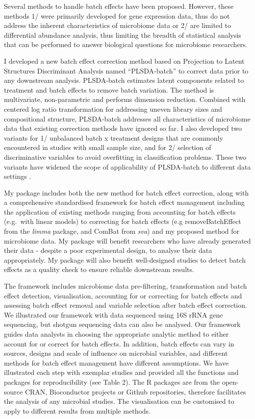 \documentclass[
]{book}
\begin{document}
Several methods to handle batch effects have been proposed. However, these methods 1/ were primarily developed for gene expression data, thus do not address the inherent characteristics of microbiome data or 2/ are limited to differential abundance analysis, thus limiting the breadth of statistical analysis that can be performed to answer biological questions for microbiome researchers.

I developed a new batch effect correction method based on Projection to Latent Structures Discriminant Analysis named ``PLSDA-batch'' to correct data prior to any downstream analysis. PLSDA-batch estimates latent components related to treatment and batch effects to remove batch variation. The method is multivariate, non-parametric and performs dimension reduction. Combined with centered log ratio transformation for addressing uneven library sizes and compositional structure, PLSDA-batch addresses all characteristics of microbiome data that existing correction methods have ignored so far. I also developed two variants for 1/ unbalanced batch x treatment designs that are commonly encountered in studies with small sample size, and for 2/ selection of discriminative variables to avoid overfitting in classification problems. These two variants have widened the scope of applicability of PLSDA-batch to different data settings \citep{wang2020multivariate}.

My package includes both the new method for batch effect correction, along with a comprehensive standardised framework for batch effect management including the application of existing methods ranging from accounting for batch effects (e.g.~with linear models) to correcting for batch effects (e.g removeBatchEffect from the \emph{limma} package, and ComBat from \emph{sva}) and my proposed method for microbiome data. My package will benefit researchers who have already generated their data - despite a poor experimental design, to analyse their data appropriately. My package will also benefit well-designed studies to detect batch effects as a quality check to ensure reliable downstream results.

The framework includes microbiome data pre-filtering, transformation and batch effect detection, visualisation, accounting for or correcting for batch effects and assessing batch effect removal and variable selection after batch effect correction. We illustrated our framework with data sequenced using 16S rRNA gene sequencing, but shotgun sequencing data can also be analysed. Our framework guides data analysts in choosing the appropriate analytic method to either account for or correct for batch effects. In addition, batch effects can vary in sources, designs and scale of influence on microbial variables, and different methods for batch effect management have different assumptions. We have illustrated each step with exemplar studies and provided all the functions and packages for reproducibility (see Table 2). The R packages are from the open-source CRAN, Bioconductor projects or Github repositories, therefore facilitates the analysis of any microbial studies. The visualisation can be customised to apply to different results from multiple methods.
\end{document}

